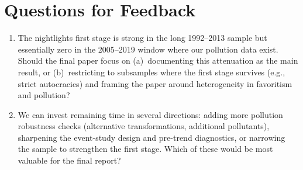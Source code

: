 \documentclass[11pt]{article}
\begin{document}
\section{Questions for Feedback}
\begin{enumerate}[leftmargin=*]
    \item The nightlights first stage is strong in the long 1992--2013 sample but essentially zero in the 2005--2019 window where our pollution data exist. Should the final paper focus on (a)~documenting this attenuation as the main result, or (b)~restricting to subsamples where the first stage survives (e.g., strict autocracies) and framing the paper around heterogeneity in favoritism and pollution?
    \item We can invest remaining time in several directions: adding more pollution robustness checks (alternative transformations, additional pollutants), sharpening the event-study design and pre-trend diagnostics, or narrowing the sample to strengthen the first stage. Which of these would be most valuable for the final report?
\end{enumerate}
\end{document}
